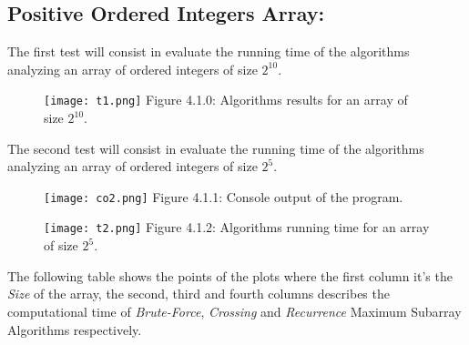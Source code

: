 \subsection{Positive Ordered Integers Array:}

The first test will consist in evaluate the running time of the algorithms analyzing an array of ordered integers of size $2^{10}$. \hfill \break

\begin{figure}[H]
\texttt{[image: t1.png]}
\centering \linebreak \linebreak Figure 4.1.0: Algorithms results for an array of size $2^{10}$.
\end{figure} \hfill 

{\bfseries\itshape\color{carmine}{Observation:}} {\itshape{}}

\pagebreak

The second test will consist in evaluate the running time of the algorithms analyzing an array of ordered integers of size $2^{5}$. \hfill \break

\begin{figure}[H]
\texttt{[image: co2.png]}
\centering \linebreak \linebreak Figure 4.1.1: Console output of the program.
\end{figure} \hfill 

\begin{figure}[H]
\texttt{[image: t2.png]}
\centering \linebreak \linebreak Figure 4.1.2: Algorithms running time for an array of size $2^{5}$.
\end{figure} \hfill 

\pagebreak

The following table shows the points of the plots where the first column it's the {\itshape Size} of the array, the second, third and fourth columns describes the computational time of {\itshape Brute-Force}, {\itshape Crossing} and {\itshape Recurrence} Maximum Subarray Algorithms respectively. \hfill \break

